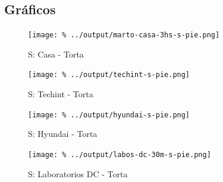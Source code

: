 \documentclass[final,narroweqnarray,inline]{ieee}
\begin{document}
  \subsection{Gráficos}
    \begin{figure}[h]\begin{center}
      \texttt{[image: \%
      ../output/marto-casa-3hs-s-pie.png]}
      \vspace{-2em}
      \caption{S: Casa - Torta}
      \label{marto-casa-3hs-s-pie}
    \end{center}\end{figure}
    \begin{figure}[h]\begin{center}
      \texttt{[image: \%
      ../output/techint-s-pie.png]}
      \vspace{-2em}
      \caption{S: Techint - Torta}
      \label{techint-s-pie}
    \end{center}\end{figure}
    \begin{figure}[h]\begin{center}
      \texttt{[image: \%
      ../output/hyundai-s-pie.png]}
      \vspace{-2em}
      \caption{S: Hyundai - Torta}
      \label{hyundai-s-pie}
    \end{center}\end{figure}
    \begin{figure}[h]\begin{center}
      \texttt{[image: \%
      ../output/labos-dc-30m-s-pie.png]}
      \vspace{-2em}
      \caption{S: Laboratorios DC - Torta}
      \label{labos-dc-30m-s-pie}
    \end{center}\end{figure}
\end{document}
